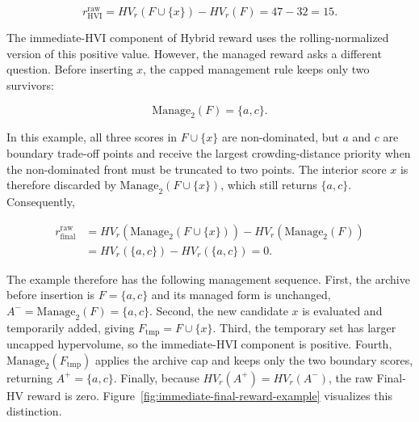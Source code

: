 \documentclass[../main.tex]{subfiles}
\begin{document}
\begin{equation}
  r_{\mathrm{HVI}}^{\mathrm{raw}}
  =
  HV_r(F\cup\{x\})-HV_r(F)
  =
  47-32
  =
  15.
\end{equation}

The immediate-HVI component of Hybrid reward uses the rolling-normalized version of this positive value. However, the managed reward asks a different question. Before inserting $x$, the capped management rule keeps only two survivors:

\begin{equation}
  \mathrm{Manage}_2(F)=\{a,c\}.
\end{equation}

In this example, all three scores in $F\cup\{x\}$ are non-dominated, but $a$ and $c$ are boundary trade-off points and receive the largest crowding-distance priority when the non-dominated front must be truncated to two points. The interior score $x$ is therefore discarded by $\mathrm{Manage}_2(F\cup\{x\})$, which still returns $\{a,c\}$. Consequently,

\begin{equation}
  \begin{aligned}
    r_{\mathrm{final}}^{\mathrm{raw}}
    &=
    HV_r(\mathrm{Manage}_2(F\cup\{x\}))
    -
    HV_r(\mathrm{Manage}_2(F))\\
    &=
    HV_r(\{a,c\})-HV_r(\{a,c\})
    =
    0.
  \end{aligned}
\end{equation}

The example therefore has the following management sequence. First, the archive before insertion is $F=\{a,c\}$ and its managed form is unchanged, $A^-=\mathrm{Manage}_2(F)=\{a,c\}$. Second, the new candidate $x$ is evaluated and temporarily added, giving $F_{\mathrm{tmp}}=F\cup\{x\}$. Third, the temporary set has larger uncapped hypervolume, so the immediate-HVI component is positive. Fourth, $\mathrm{Manage}_2(F_{\mathrm{tmp}})$ applies the archive cap and keeps only the two boundary scores, returning $A^+=\{a,c\}$. Finally, because $HV_r(A^+)=HV_r(A^-)$, the raw Final-HV reward is zero. Figure~\ref{fig:immediate-final-reward-example} visualizes this distinction.
\end{document}
